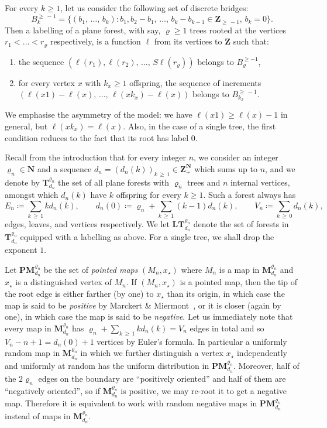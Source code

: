 \documentclass[AHL,Unicode,longabstracts,published]{cedram}
\newcommand{\ensembles}[1]{\mathbf{#1}}
\newcommand{\N}{\ensembles{N}}
\newcommand{\Z}{\ensembles{Z}}
\newcommand{\1}{\ensembles{1}}
\newcommand{\Tree}{\mathbf{T}}
\newcommand{\Map}{\mathbf{M}}
\newcommand{\PMap}{\mathbf{PM}}
\newcommand{\LTree}{\mathbf{LT}}
\renewcommand{\ge}{\geqslant}
\newcommand{\BBmap}{B}
\newcommand{\Fn}{\Tree_{d_n}^{\varrho_n}}
\newcommand{\PMn}{\PMap_{d_n}^{\varrho_n}}
\newcommand{\Mn}{\Map_{d_n}^{\varrho_n}}
\newcommand{\LFn}{\LTree_{d_n}^{\varrho_n}}
\newcommand{\edges}{E}
\newcommand{\vertices}{V}
\begin{document}
For every $k \ge 1$, let us consider the following set of discrete bridges:
\begin{equation}\label{eq:def_pont}
\BBmap_k^{\ge\,-1} = \big\{(b_1,\,\dots,\, b_k): b_1, b_2-b_1,\,\dots,\,b_k-b_{k-1} \in \Z_{\ge\,-1},\, b_k=0\big\}.
\end{equation}
Then a labelling of a plane forest, with say, $\varrho \ge 1$ trees rooted at the vertices $r_1 < \dots < r_\varrho$ respectively, is a function $\ell$ from its vertices to $\Z$ such that:
\begin{enumerate}
\item the sequence $(\ell(r_1), \ell(r_2),\, \dots,\,S\ell(r_\varrho))$ belongs to $\BBmap_{\varrho}^{\ge -1}$,
\item for every vertex $x$ with $k_x \ge 1$ offspring, the sequence of increments $(\ell(x1)-\ell(x),\,\dots,\,\ell(xk_x)-\ell(x))$ belongs to $\BBmap_{k_x}^{\ge\, -1}$.
\end{enumerate}
We emphasise the asymmetry of the model: we have $\ell(x1) \ge \ell(x)-1$ in general, but $\ell(xk_x)=\ell(x)$. Also, in the case of a single tree, the first condition reduces to the fact that its root has label $0$.



Recall from the introduction that for every integer $n$, we consider an integer $\varrho_n \in \N$ and a sequence $d_n = (d_n(k))_{k\,\ge\,1} \in \Z_+^{\N}$ which sums up to $n$, and we denote by $\Tree_{d_n}^{\varrho_n}$ the set of all plane forests with $\varrho_n$ trees and $n$ internal vertices, amongst which $d_n(k)$ have $k$ offspring for every $k \ge 1$. Such a forest always has
\[
\edges_n \coloneqq \sum_{k\,\ge\,1} k d_n(k),
\qquad d_n(0) \coloneqq \varrho_n + \sum_{k \,\ge\,1} (k-1) d_n(k),
\qquad
\vertices_n \coloneqq \sum_{k\,\ge\,0} d_n(k),
\]
edges, leaves, and vertices respectively. We let $\LFn$ denote the set of forests in $\Fn$ equipped with a labelling as above. For a single tree, we shall drop the exponent $1$.


Let $\PMn$ be the set of \emph{pointed maps} $(M_n, x_\star)$ where $M_n$ is a map in $\Mn$ and $x_\star$ is a distinguished vertex of $M_n$. If $(M_n, x_\star)$ is a pointed map, then the tip of the root edge is either farther (by one) to $x_\star$ than its origin, in which case the map is said to be \emph{positive} by Marckert \& Miermont~\cite{MM07}, or it is closer (again by one), in which case the map is said to be \emph{negative}. Let us immediately note that every map in $\Mn$ has $\varrho_n + \sum_{k \,\ge\,1} k d_n(k) = \vertices_n$ edges in total and so $\vertices_n - n + 1 = d_n(0) + 1$ vertices by Euler's formula. In particular a uniformly random map in $\Mn$ in which we further distinguish a vertex $x_\star$ independently and uniformly at random has the uniform distribution in $\PMn$. Moreover, half of the $2 \varrho_n$ edges on the boundary are ``positively oriented'' and half of them are ``negatively oriented'', so if $\Mn$ is positive, we may re-root it to get a negative map. Therefore it is equivalent to work with random negative maps in $\PMn$ instead of maps in $\Mn$.
\end{document}
